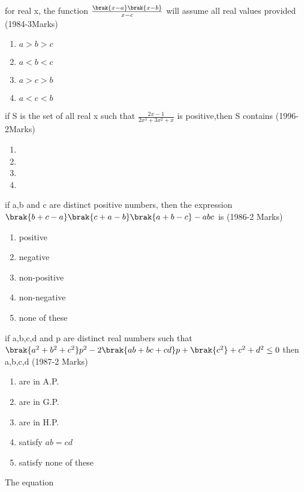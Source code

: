 
\iffalse
  \title{Assignment}
  \author{Student Name}
  \section{mcq-multiple}
\fi
\item for real x, the function $\frac{\brak{x-a}\brak{x-b}}{x-c}$ will assume all real values provided \hfill (1984-3Marks)
\begin{multicols}{2}
\begin{enumerate}
    \item $a>b>c$
    \item $a<b<c$
    \item $a>c>b$
    \item $a<c<b$
\end{enumerate}
    
\end{multicols}
\item if S is the set of all real x such that $\frac{2x-1}{2x^{3}+3x^{2}+x}$ is positive,then S contains \hfill (1996-2Marks)
\begin{multicols}{2}
\begin{enumerate}
    \item {}
    \item {}
    \item {}
    \item {}
\end{enumerate}
    
\end{multicols}
\item if a,b and c are distinct positive numbers, then the expression $\brak{b+c-a}\brak{c+a-b}\brak{a+b-c}-abc$ is \hfill (1986-2 Marks)
\begin{enumerate}
    \item positive
    \item negative
    \item non-positive
    \item non-negative
    \item none of these
\end{enumerate}
\item if a,b,c,d and p are distinct real numbers such that $\brak{a^{2}+b^{2}+c^{2}}p^{2}-2\brak{ab+bc+cd}p+\brak{c^{2}}+c^{2}+d^{2}\leq 0$ then a,b,c,d \hfill (1987-2 Marks)
\begin{enumerate}
    \item are in A.P.
    \item are in G.P.
    \item are in H.P.
    \item satisfy $ab=cd$
    \item satisfy none of these
\end{enumerate}
\item The equation

